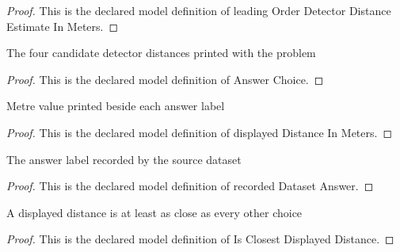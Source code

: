 \begin{proof}
  This is the declared model definition of leading Order Detector Distance Estimate In Meters.
\end{proof}
\begin{definition}
  \label{def:physics:phyx-mini-0507:phyxminiproblems-problemphyxmini0507-answerchoice}
  The four candidate detector distances printed with the problem
\end{definition}
\begin{proof}
  This is the declared model definition of Answer Choice.
\end{proof}
\begin{definition}
  \label{def:physics:phyx-mini-0507:phyxminiproblems-problemphyxmini0507-displayeddistanceinmeters}
  Metre value printed beside each answer label
\end{definition}
\begin{proof}
  This is the declared model definition of displayed Distance In Meters.
\end{proof}
\begin{definition}
  \label{def:physics:phyx-mini-0507:phyxminiproblems-problemphyxmini0507-recordeddatasetanswer}
  The answer label recorded by the source dataset
\end{definition}
\begin{proof}
  This is the declared model definition of recorded Dataset Answer.
\end{proof}
\begin{definition}
  \label{def:physics:phyx-mini-0507:phyxminiproblems-problemphyxmini0507-isclosestdisplayeddistance}
  A displayed distance is at least as close as every other choice
\end{definition}
\begin{proof}
  This is the declared model definition of Is Closest Displayed Distance.
\end{proof}
